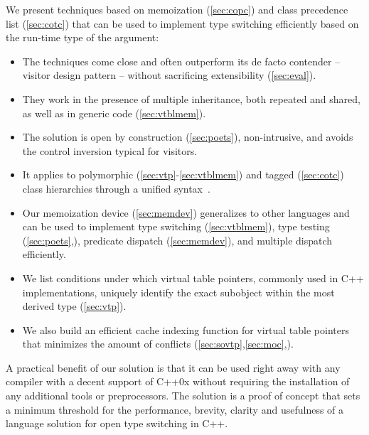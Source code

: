 We present techniques based on memoization (\textsection\ref{sec:copc}) and 
class precedence list (\textsection\ref{sec:cotc}) that can be used to
implement type switching efficiently based on the run-time type of the
argument:
  \begin{itemize}
  \setlength{\itemsep}{0pt}
  \setlength{\parskip}{0pt}
  \item The techniques come close and often outperform its de facto contender -- 
        visitor design pattern -- without sacrificing extensibility (\textsection\ref{sec:eval}).
  \item They work in the presence of multiple inheritance, both repeated and 
  shared, as well as in generic code (\textsection\ref{sec:vtblmem}).
  \item The solution is open by construction (\textsection\ref{sec:poets}), 
        non-intrusive, and avoids the control inversion typical for visitors.
  \item It applies to polymorphic (\textsection\ref{sec:vtp}-\ref{sec:vtblmem}) and 
        tagged (\textsection\ref{sec:cotc}) class hierarchies through a unified  
        syntax~\cite[]{TR}.
  \item Our memoization device (\textsection\ref{sec:memdev}) generalizes to 
        other languages and can be used to implement type switching 
        (\textsection\ref{sec:vtblmem}), type testing 
        (\textsection\ref{sec:poets},\cite[]{TR}), predicate dispatch 
        (\textsection\ref{sec:memdev}), and multiple dispatch efficiently.
  \item We list conditions under which virtual table pointers, commonly used in 
        C++ implementations, uniquely identify the exact subobject within the 
        most derived type (\textsection\ref{sec:vtp}).
  \item We also build an efficient cache indexing function for virtual table 
        pointers that minimizes the amount of conflicts 
        (\textsection\ref{sec:sovtp},\ref{sec:moc},\cite[.2]{TR}).
  \end{itemize}

\noindent
A practical benefit of our solution is that it can be used right away with any 
compiler with a decent support of C++0x without requiring the installation of 
any additional tools or preprocessors. The solution is a proof of concept that 
sets a minimum threshold for the performance, brevity, clarity and usefulness of 
a language solution for open type switching in C++.


